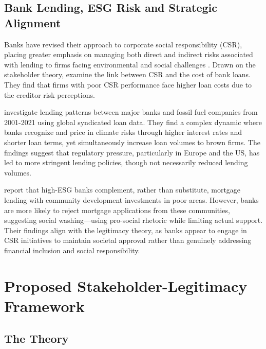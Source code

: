 \documentclass[
  authoryear]{elsarticle}
\begin{document}
\subsection{Bank Lending, ESG Risk and Strategic
Alignment}\label{bank-lending-esg-risk-and-strategic-alignment}

Banks have revised their approach to corporate social responsibility
(CSR), placing greater emphasis on managing both direct and indirect
risks associated with lending to firms facing environmental and social
challenges \citep{CARNEVALE2012}. Drawn on the stakeholder theory,
\citet{GOSS2011} examine the link between CSR and the cost of bank
loans. They find that firms with poor CSR performance face higher loan
costs due to the creditor risk perceptions.

\citet{DEMETRIADES2025} investigate lending patterns between major banks
and fossil fuel companies from 2001-2021 using global syndicated loan
data. They find a complex dynamic where banks recognize and price in
climate risks through higher interest rates and shorter loan terms, yet
simultaneously increase loan volumes to brown firms. The findings
suggest that regulatory pressure, particularly in Europe and the US, has
led to more stringent lending policies, though not necessarily reduced
lending volumes.

\citet{BASU2022} report that high-ESG banks complement, rather than
substitute, mortgage lending with community development investments in
poor areas. However, banks are more likely to reject mortgage
applications from these communities, suggesting social washing---using
pro-social rhetoric while limiting actual support. Their findings align
with the legitimacy theory, as banks appear to engage in CSR initiatives
to maintain societal approval rather than genuinely addressing financial
inclusion and social responsibility.

\section{Proposed Stakeholder-Legitimacy
Framework}\label{proposed-stakeholder-legitimacy-framework}

\subsection{The Theory}\label{the-theory}
\end{document}
